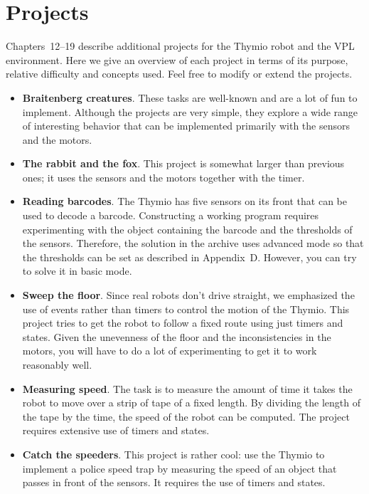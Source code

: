 \documentclass[11pt,a4paper,english]{article}
\begin{document}

\section{Projects}

Chapters~12--19 describe additional projects for the Thymio robot and
the VPL environment. Here we give an overview of each project in terms
of its purpose, relative difficulty and concepts used. Feel free to
modify or extend the projects.

\begin{itemize}

\item \textbf{Braitenberg creatures}. These tasks are well-known and are
a lot of fun to implement. Although the projects are very simple, they
explore a wide range of interesting behavior that can be implemented
primarily with the sensors and the motors.

\item \textbf{The rabbit and the fox}. This project is somewhat larger
than previous ones; it uses the sensors and the motors together with the
timer.

\item \textbf{Reading barcodes}. The Thymio has five sensors on its
front that can be used to decode a barcode. Constructing a working
program requires experimenting with the object containing the barcode
and the thresholds of the sensors. Therefore, the solution in the
archive uses advanced mode so that the thresholds can be set as
described in Appendix~D. However, you can try to solve it in basic mode.

\item \textbf{Sweep the floor}. Since real robots don't drive straight,
we emphasized the use of events rather than timers to control the motion
of the Thymio. This project tries to get the robot to follow a fixed
route using just timers and states. Given the unevenness of the floor
and the inconsistencies in the motors, you will have to do a lot of
experimenting to get it to work reasonably well.

\item \textbf{Measuring speed}. The task is to measure the amount of
time it takes the robot to move over a strip of tape of a fixed length.
By dividing the length of the tape by the time, the speed of the robot
can be computed. The project requires extensive use of timers and
states.

\item \textbf{Catch the speeders}. This project is rather cool: use
the Thymio to implement a police speed trap by measuring the speed of
an object that passes in front of the sensors. It requires the use
of timers and states. 


\end{itemize}
\end{document}

